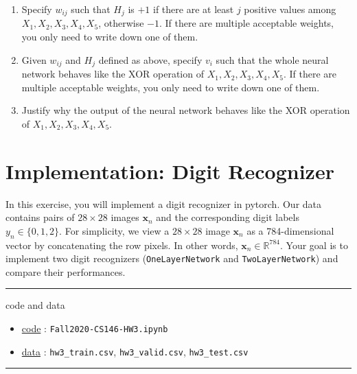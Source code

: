 \documentclass[11pt]{article}
\begin{document}
\begin{enumerate}
    \item { Specify $w_{ij}$ such that $H_j$ is $+1$ if there are at least $j$ positive values among $X_1, X_2, X_3, X_4, X_5$, otherwise $-1$. If there are multiple acceptable weights, you only need to write down one of them. 
    
    \solution{}

    }
    \item { Given $w_{ij}$ and $H_j$ defined as above, specify $v_i$ such that the whole neural network behaves like the XOR operation of $X_1, X_2, X_3, X_4, X_5$. If there are multiple acceptable weights, you only need to write down one of them. 
    
    \solution{}
    }
    
    \item { Justify why the output of the neural network behaves like the XOR operation of $X_1, X_2, X_3, X_4, X_5$. 
    
    \solution{}
    }
\end{enumerate}

\section{Implementation: Digit Recognizer }

In this exercise, you will implement a digit recognizer in pytorch. Our data contains pairs of $28 \times 28$ images $\mathbf{x}_n$ and the corresponding digit labels $y_n \in \{0, 1, 2\}$. For simplicity, we view a $28 \times 28$ image $\mathbf{x}_n$ as a 784-dimensional vector by concatenating the row pixels. In other words, $\mathbf{x}_n \in \mathbb{R}^{784}$. Your goal is to implement two digit recognizers (\verb|OneLayerNetwork| and \verb|TwoLayerNetwork|) and compare their performances.


\rule{\textwidth}{1pt}
code and data
\begin{itemize}[nolistsep]
\item \href{https://colab.research.google.com/drive/1eBjmXxPAiJaK2FoKFDhyrG5Xc49pMPyt?usp=sharing}{code} : \verb|Fall2020-CS146-HW3.ipynb|
\item \href{https://drive.google.com/drive/folders/1UHUD_a1RtRW74H0TrC8pAoO6vDSXyns3?usp=sharing}{data} : \verb|hw3_train.csv|, \verb|hw3_valid.csv|, \verb|hw3_test.csv|
\end{itemize}
\rule{\textwidth}{1pt}
\end{document}
